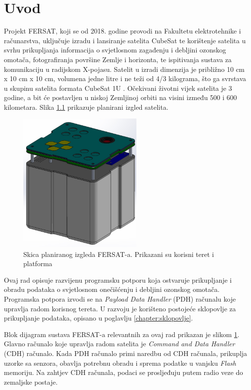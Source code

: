 \chapter{Uvod}
    Projekt FERSAT, koji se od 2018. godine provodi na Fakultetu elektrotehnike i računarstva, uključuje izradu i lansiranje satelita CubeSat te korištenje satelita u svrhu prikupljanja informacija o svjetlosnom zagađenju i debljini ozonskog omotača, fotografiranja površine Zemlje i horizonta, te ispitivanja sustava za komunikaciju u radijskom X-pojasu. Satelit u izradi dimenzija je približno 10 cm x 10 cm x 10 cm, volumena jedne litre i ne teži od 4/3 kilograma, što ga svrstava u skupinu satelita formata CubeSat 1U \cite{fersat_stranica_projekta}. Očekivani životni vijek satelita je 3 godine, a bit će postavljen u niskoj Zemljinoj orbiti na visini između 500 i 600 kilometara. Slika \ref{fig:fersat} prikazuje planirani izgled satelita.
    
    \begin{figure}[htb]
        \centering
        \includegraphics[height=7cm]{slike/fersat.png}
        \caption{Skica planiranog izgleda FERSAT-a. Prikazani su korisni teret  i platforma  \cite{fersat_stranica_projekta}}
        \label{fig:fersat}
    \end{figure}

    Ovaj rad opisuje razvijenu programsku potporu koja ostvaruje prikupljanje i obradu podataka o svjetlosnom onečišćenju i debljini ozonskog omotača. Programska potpora izvodi se na \textit{Payload Data Handler} (PDH) računalu koje upravlja radom korisnog tereta. U razvoju je korišteno postojeće sklopovlje za prikupljanje podataka, opisano u poglavlju \ref{chapter:sklopovlje}.

    Blok dijagram sustava FERSAT-a relevantnih za ovaj rad prikazan je slikom \ref{}. Glavno računalo koje upravlja radom satelita je \textit{Command and Data Handler} (CDH) računalo. Kada PDH računalo primi naredbu od CDH računala, prikuplja uzorke sa senzora, obavlja potrebnu obradu i sprema podatke u vanjsku \textit{Flash} memoriju. Na zahtjev CDH računala, podaci se prosljeđuju putem radio veze do zemaljske postaje. 
    
